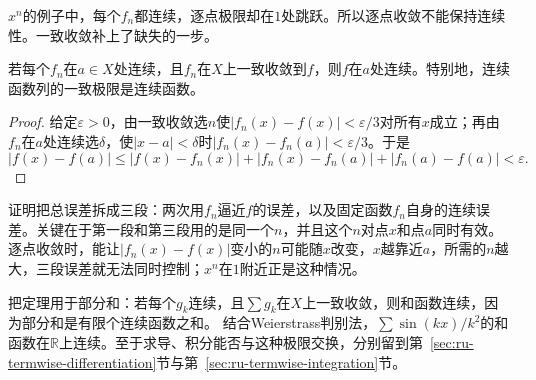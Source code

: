 $x^n$的例子中，每个$f_n$都连续，逐点极限却在$1$处跳跃。所以逐点收敛不能保持连续性。一致收敛补上了缺失的一步。
\begin{theorem}[一致极限保持连续]
\label{thm:ru-uniform-limit-continuity}
若每个$f_n$在$a\in X$处连续，且$f_n$在$X$上一致收敛到$f$，则$f$在$a$处连续。特别地，连续函数列的一致极限是连续函数。
\end{theorem}
\begin{proof}
给定$\varepsilon>0$，由一致收敛选$n$使$|f_n(x)-f(x)|<\varepsilon/3$对所有$x$成立；再由$f_n$在$a$处连续选$\delta$，使$|x-a|<\delta$时$|f_n(x)-f_n(a)|<\varepsilon/3$。于是
\[
 |f(x)-f(a)|\leq|f(x)-f_n(x)|+|f_n(x)-f_n(a)|+|f_n(a)-f(a)|<\varepsilon.
\]
\end{proof}
证明把总误差拆成三段：两次用$f_n$逼近$f$的误差，以及固定函数$f_n$自身的连续误差。关键在于第一段和第三段用的是同一个$n$，并且这个$n$对点$x$和点$a$同时有效。
逐点收敛时，能让$|f_n(x)-f(x)|$变小的$n$可能随$x$改变，$x$越靠近$a$，所需的$n$越大，三段误差就无法同时控制；$x^n$在$1$附近正是这种情况。

把定理用于部分和：若每个$g_k$连续，且$\sum g_k$在$X$上一致收敛，则和函数连续，因为部分和是有限个连续函数之和。
结合Weierstrass判别法，$\sum\sin(kx)/k^2$的和函数在$\mathbb R$上连续。至于求导、积分能否与这种极限交换，分别留到第~\ref{sec:ru-termwise-differentiation}节与第~\ref{sec:ru-termwise-integration}节。
